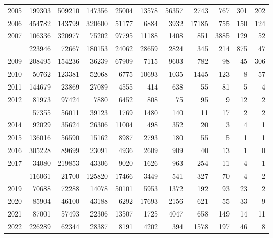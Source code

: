 \documentclass[
]{article}
\begin{document}
\begin{longtable}[t]{lrrrrrrrrrr}
2005 & 199303 & 509210 & 147356 & 25004 & 13578 & 56357 & 2743 & 767 & 301 & 202\\
2006 & 454782 & 143799 & 320600 & 51177 & 6884 & 3932 & 17185 & 755 & 150 & 124\\
2007 & 106336 & 320977 & 75202 & 97795 & 11188 & 1408 & 851 & 3885 & 129 & 52\\
\addlinespace
2008 & 223946 & 72667 & 180153 & 24062 & 28659 & 2824 & 345 & 214 & 875 & 47\\
2009 & 208495 & 154236 & 36239 & 67909 & 7115 & 9603 & 782 & 98 & 45 & 306\\
2010 & 50762 & 123381 & 52068 & 6775 & 10693 & 1035 & 1445 & 123 & 8 & 57\\
2011 & 144679 & 23869 & 27089 & 4555 & 414 & 638 & 55 & 81 & 5 & 4\\
2012 & 81973 & 97424 & 7880 & 6452 & 808 & 75 & 95 & 9 & 12 & 2\\
\addlinespace
2013 & 57355 & 56011 & 39123 & 1769 & 1480 & 140 & 11 & 17 & 2 & 2\\
2014 & 92029 & 35624 & 26306 & 11004 & 498 & 352 & 20 & 3 & 4 & 1\\
2015 & 136016 & 56590 & 15162 & 8987 & 2793 & 180 & 55 & 5 & 1 & 1\\
2016 & 305228 & 89699 & 23091 & 4936 & 2609 & 909 & 40 & 13 & 1 & 0\\
2017 & 34080 & 219853 & 43306 & 9020 & 1626 & 963 & 254 & 11 & 4 & 1\\
\addlinespace
2018 & 116061 & 21700 & 125820 & 17466 & 3449 & 541 & 327 & 70 & 4 & 2\\
2019 & 70688 & 72288 & 14078 & 50101 & 5953 & 1372 & 192 & 93 & 23 & 2\\
2020 & 85904 & 46100 & 43188 & 6292 & 17693 & 2156 & 621 & 55 & 33 & 9\\
2021 & 87001 & 57493 & 22306 & 13507 & 1725 & 4047 & 658 & 149 & 14 & 11\\
2022 & 226289 & 62344 & 28387 & 8191 & 4202 & 394 & 1578 & 197 & 46 & 8\\*
\end{longtable}
\end{document}
